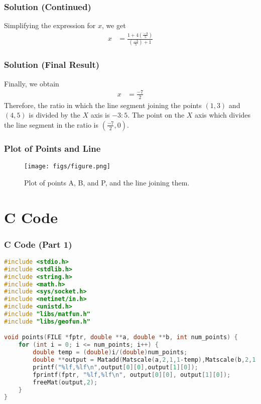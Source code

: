 \documentclass{beamer}
\providecommand{\brak}[1]{\ensuremath{\left(#1\right)}}
\theoremstyle{remark}
\begin{document}
\begin{frame}
\frametitle{Solution (Continued)}
Simplifying the expression for \( x \), we get
\begin{align}
x&=\frac{1+4\brak{\frac{-3}{5}}}{\brak{\frac{-3}{5}}+1}
\end{align}
\end{frame}

\begin{frame}
\frametitle{Solution (Final Result)}
Finally, we obtain
\begin{align}
x&=\frac{-7}{2}
\end{align}
Therefore, the ratio in which the line segment joining the points \brak{1,3} and \brak{4,5} is divided by the $X$ axis is \( -3:5 \). The point on the $X$ axis which divides the line segment in the ratio is \brak{\frac{-7}{2}, 0}.
\end{frame}

\begin{frame}
\frametitle{Plot of Points and Line}
\begin{figure}[h!]
\centering
\texttt{[image: figs/figure.png]}    
\caption{Plot of points A, B, and P, and the line joining them.}
\label{Plot of points A,B and P and the line joining them}
\end{figure}
\end{frame}

\section{C Code}
\begin{frame}[fragile]
\frametitle{C Code (Part 1)}
\vspace{0.3cm} %
\begin{lstlisting}[language=C]
#include <stdio.h>
#include <stdlib.h>
#include <string.h>
#include <math.h>
#include <sys/socket.h>
#include <netinet/in.h>
#include <unistd.h>
#include "libs/matfun.h"
#include "libs/geofun.h"

void points(FILE *fptr, double **a, double **b, int num_points) {
    for (int i = 0; i <= num_points; i++) {
        double temp = (double)i/(double)num_points;
        double **output = Matadd(Matscale(a,2,1,1-temp),Matscale(b,2,1,temp),2,1);
        printf("%lf,%lf\n",output[0][0],output[1][0]);
        fprintf(fptr, "%lf,%lf\n", output[0][0], output[1][0]);
        freeMat(output,2);
    }
}
\end{lstlisting}
\vspace{0.5cm} %
\end{frame}
\end{document}
